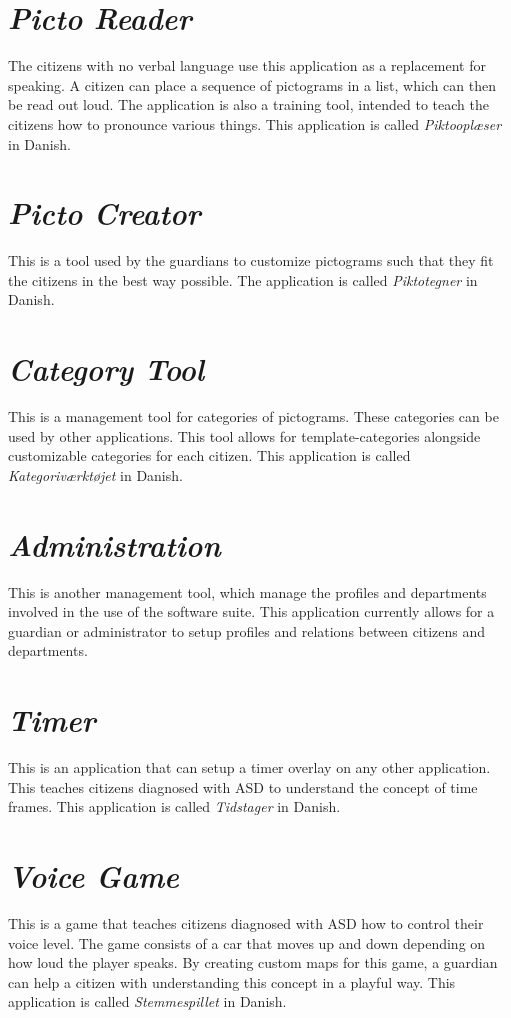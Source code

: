 \section{\emph{Picto Reader}}
\label{sec:app_picto_reader}
The citizens with no verbal language use this application as a replacement for speaking. A citizen can place a sequence of pictograms in a list, which can then be read out loud. The application is also a training tool, intended to teach the citizens how to pronounce various things. This application is called \emph{Piktooplæser} in Danish.

\section{\emph{Picto Creator}}
\label{sec:app_picto_creator}
This is a tool used by the guardians to customize pictograms such that they fit the citizens in the best way possible. The application is called \emph{Piktotegner} in Danish.

\section{\emph{Category Tool}}
\label{sec:app_category_tool}
This is a management tool for categories of pictograms. These categories can be used by other applications. This tool allows for template-categories alongside customizable categories for each citizen. This application is called \emph{Kategoriværktøjet} in Danish.

\section{\emph{Administration}}
\label{sec:app_administration}
This is another management tool, which manage the profiles and departments involved in the use of the \giraf software suite. This application currently allows for a guardian or administrator to setup profiles and relations between citizens and departments.

\section{\emph{Timer}}
\label{sec:app_timer}
This is an application that can setup a timer overlay on any other application. This teaches citizens diagnosed with ASD to understand the concept of time frames. This application is called \emph{Tidstager} in Danish.

\section{\emph{Voice Game}}
\label{sec:app_voice_game}
This is a game that teaches citizens diagnosed with ASD how to control their voice level. The game consists of a car that moves up and down depending on how loud the player speaks. By creating custom maps for this game, a guardian can help a citizen with understanding this concept in a playful way. This application is called \emph{Stemmespillet} in Danish.

